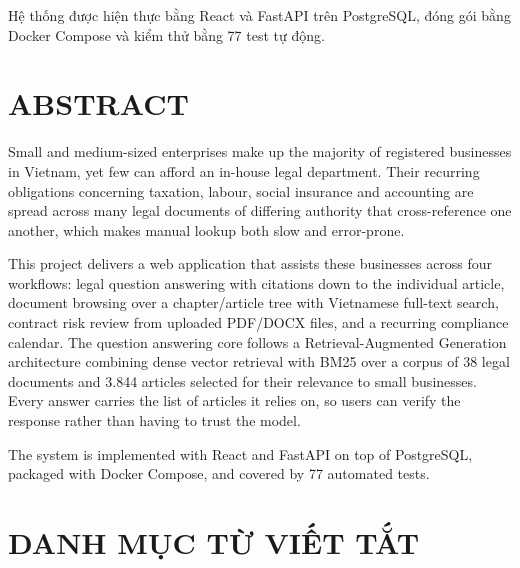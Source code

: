 \documentclass[12pt,a4paper]{report}
\numberwithin{equation}{chapter}
\numberwithin{figure}{chapter}
\numberwithin{table}{chapter}
\newcommand{\soLuat}{38}
\newcommand{\soDieu}{3.844}
\newcommand{\soTest}{77}
\begin{document}
Hệ thống được hiện thực bằng React và FastAPI trên PostgreSQL, đóng gói bằng
Docker Compose và kiểm thử bằng \soTest{} test tự động.

\clearpage

\chapter*{ABSTRACT}

Small and medium-sized enterprises make up the majority of registered businesses
in Vietnam, yet few can afford an in-house legal department. Their recurring
obligations concerning taxation, labour, social insurance and accounting are
spread across many legal documents of differing authority that cross-reference
one another, which makes manual lookup both slow and error-prone.

This project delivers a web application that assists these businesses across
four workflows: legal question answering with citations down to the individual
article, document browsing over a chapter/article tree with Vietnamese full-text
search, contract risk review from uploaded PDF/DOCX files, and a recurring
compliance calendar. The question answering core follows a
Retrieval-Augmented Generation architecture combining dense vector retrieval with
BM25 over a corpus of \soLuat{} legal documents and \soDieu{} articles selected
for their relevance to small businesses. Every answer carries the list of
articles it relies on, so users can verify the response rather than having to
trust the model.

The system is implemented with React and FastAPI on top of PostgreSQL, packaged
with Docker Compose, and covered by \soTest{} automated tests.

\clearpage

\tableofcontents
\clearpage

{}
\chapter*{DANH MỤC TỪ VIẾT TẮT}
\end{document}
